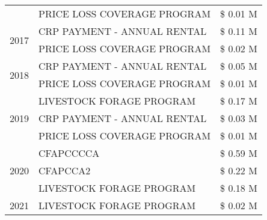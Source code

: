 \begin{tabular}{llr}
 & PRICE LOSS COVERAGE PROGRAM & \$ 0.01 M \\
\cline{1-3}
\multirow[t]{2}{*}{2017} & CRP PAYMENT - ANNUAL RENTAL & \$ 0.11 M \\
 & PRICE LOSS COVERAGE PROGRAM & \$ 0.02 M \\
\cline{1-3}
\multirow[t]{2}{*}{2018} & CRP PAYMENT - ANNUAL RENTAL & \$ 0.05 M \\
 & PRICE LOSS COVERAGE PROGRAM & \$ 0.01 M \\
\cline{1-3}
\multirow[t]{3}{*}{2019} & LIVESTOCK FORAGE PROGRAM & \$ 0.17 M \\
 & CRP PAYMENT - ANNUAL RENTAL & \$ 0.03 M \\
 & PRICE LOSS COVERAGE PROGRAM & \$ 0.01 M \\
\cline{1-3}
\multirow[t]{3}{*}{2020} & CFAPCCCCA & \$ 0.59 M \\
 & CFAPCCA2 & \$ 0.22 M \\
 & LIVESTOCK FORAGE PROGRAM & \$ 0.18 M \\
\cline{1-3}
2021 & LIVESTOCK FORAGE PROGRAM & \$ 0.02 M \\
\cline{1-3}
\bottomrule
\end{tabular}
